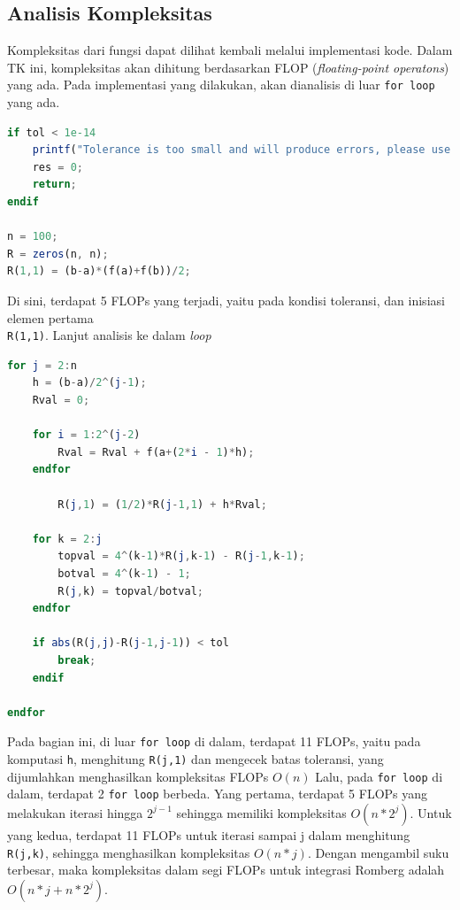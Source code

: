 \documentclass[journal,12pt,onecolumn,a4paper]{IEEEtran}
\begin{document}
\subsection{Analisis Kompleksitas}
Kompleksitas dari fungsi dapat dilihat kembali melalui implementasi kode. Dalam TK ini, kompleksitas akan dihitung berdasarkan FLOP (\emph{floating-point operatons}) yang ada.
Pada implementasi yang dilakukan, akan dianalisis di luar \lstinline{for loop} yang ada.
\begin{center}
	\begin{lstlisting}[language=Octave]
if tol < 1e-14
	printf("Tolerance is too small and will produce errors, please use larger values\n")
	res = 0;
	return;
endif

n = 100;
R = zeros(n, n);
R(1,1) = (b-a)*(f(a)+f(b))/2;
	\end{lstlisting}
\end{center}

Di sini, terdapat 5 FLOPs yang terjadi, yaitu pada kondisi toleransi, dan inisiasi elemen pertama \\ \lstinline{R(1,1)}. Lanjut analisis ke dalam \emph{loop}
\begin{center}
	\begin{lstlisting}[language=Octave]
for j = 2:n
	h = (b-a)/2^(j-1);
	Rval = 0;

	for i = 1:2^(j-2)
		Rval = Rval + f(a+(2*i - 1)*h);
	endfor

		R(j,1) = (1/2)*R(j-1,1) + h*Rval;

	for k = 2:j
		topval = 4^(k-1)*R(j,k-1) - R(j-1,k-1);
		botval = 4^(k-1) - 1;
		R(j,k) = topval/botval;
	endfor

	if abs(R(j,j)-R(j-1,j-1)) < tol
		break;
	endif

endfor
	\end{lstlisting}
\end{center}
Pada bagian ini, di luar \lstinline{for loop} di dalam, terdapat 11 FLOPs, yaitu pada komputasi \lstinline{h}, menghitung \lstinline{R(j,1)} dan mengecek batas toleransi, yang dijumlahkan menghasilkan kompleksitas FLOPs \(O(n)\)
Lalu, pada \lstinline{for loop} di dalam, terdapat 2 \lstinline{for loop} berbeda. Yang pertama, terdapat 5 FLOPs yang melakukan iterasi hingga \(2^{j-1}\) sehingga memiliki kompleksitas \(O(n*2^j)\).
Untuk yang kedua, terdapat 11 FLOPs untuk iterasi sampai j dalam menghitung \lstinline{R(j,k)}, sehingga menghasilkan kompleksitas \(O(n*j)\). Dengan mengambil suku terbesar, maka kompleksitas dalam segi FLOPs untuk integrasi Romberg adalah \(O(n*j + n*2^j)\).
\end{document}
